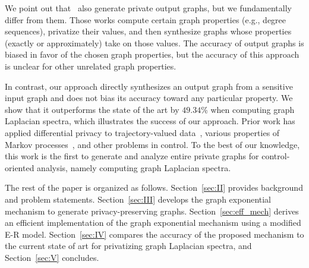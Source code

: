 \documentclass[conference]{ieeeconf}
\begin{document}

We point out that~\cite{sala2011sharing, mir2012differentially,qin2017generating} 
also generate private output graphs, but we fundamentally differ from them.
Those works compute certain graph properties (e.g., degree sequences), privatize
their values, and then synthesize graphs whose properties (exactly or approximately) 
take on those values. The accuracy of output graphs
is biased in favor of the chosen graph properties, but 
the accuracy of this approach is unclear for 
other unrelated graph properties. 

In contrast, our approach directly synthesizes an output graph from a sensitive
input graph and does not bias its accuracy toward any particular property. 
We show that it outperforms the state of the art by $49.34$\% when computing
graph Laplacian spectra, which illustrates the success of our approach. 
Prior work has applied differential privacy to trajectory-valued 
data~\cite{le2013differentially,yazdani20},
various properties of Markov processes~\cite{uaipaper,benvenuti2024differentially}, and
other problems in control. 
To the best of our knowledge,
this work is the first to generate and analyze entire private
graphs for control-oriented analysis, namely computing
graph Laplacian spectra. 

The rest of the paper is organized as follows. Section~\ref{sec:II} provides background and problem statements. Section~\ref{sec:III} develops the graph exponential mechanism to generate privacy-preserving graphs.
Section~\ref{sec:eff_mech} derives an efficient implementation of the graph exponential mechanism
using a modified E-R model.
Section~\ref{sec:IV} compares the accuracy of the proposed mechanism to the current state of art for privatizing graph Laplacian spectra, and Section~\ref{sec:V} concludes.
\end{document}
